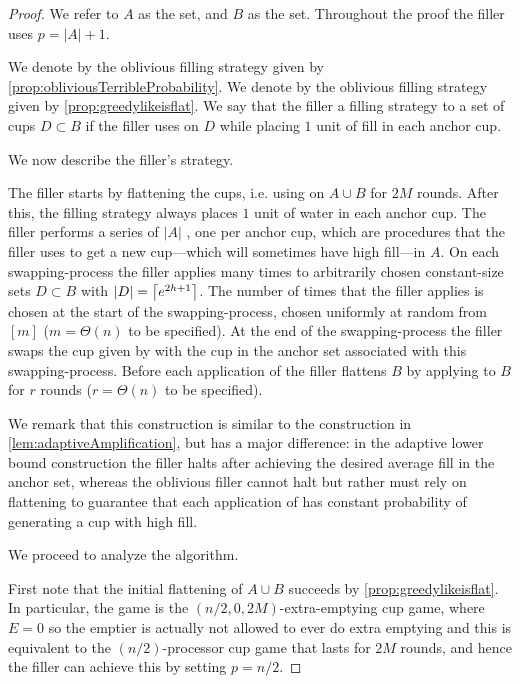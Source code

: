 \begin{proof}
  We refer to $A$ as the  set, and $B$ as the
   set.
  Throughout the proof the filler uses $p=|A|+1$.

We denote by \randalg the oblivious filling
strategy given by \cref{prop:obliviousTerribleProbability}. 
We denote by \flatalg the oblivious filling
strategy given by \cref{prop:greedylikeisflat}.
We say that the filler  a filling strategy
\genericalg to a set of cups $D \subset B$ if the filler uses
\genericalg on $D$ while placing $1$ unit of fill in each anchor cup. 

We now describe the filler's strategy.

The filler starts by flattening the cups, i.e. using \flatalg on
$A\cup B$ for $2M$ rounds. After this, the filling strategy
always places $1$ unit of water in each anchor cup. The filler
performs a series of $|A|$ , one per
anchor cup, which are procedures that the filler uses to get a
new cup---which will sometimes have high fill---in $A$. On each
swapping-process the filler applies \randalg many times to
arbitrarily chosen constant-size sets $D \subset B$ with $|D| =
\left\lceil e^{2h+1} \right\rceil$. The number of times that the filler applies
\randalg is chosen at the start of the swapping-process, chosen
uniformly at random from $[m]$ ($m = \Theta(n)$ to be
specified). At the end of the swapping-process the filler swaps
the cup given by \randalg with the cup in the anchor set
associated with this swapping-process. Before each application of
\randalg the filler flattens $B$ by applying \flatalg to $B$ for
$r$ rounds ($r=\Theta(n)$ to be specified). 

We remark that this construction is similar to
the construction in \cref{lem:adaptiveAmplification}, but has a
major difference: in the adaptive lower bound construction the
filler halts after achieving the desired average fill in the
anchor set, whereas the oblivious filler cannot halt but rather
must rely on flattening to guarantee that each application of
\randalg has constant probability of generating a cup with high fill.

We proceed to analyze the algorithm.

First note that the initial flattening of $A\cup B$ succeeds by
\cref{prop:greedylikeisflat}. In particular, the game is the 
$(n/2, 0, 2M)$-extra-emptying cup game, where $E=0$ so the
emptier is actually not allowed to ever do extra emptying and
this is equivalent to the $(n/2)$-processor cup game that lasts
for $2M$ rounds, and hence the filler can achieve this by setting
$p=n/2$.


\end{proof}
